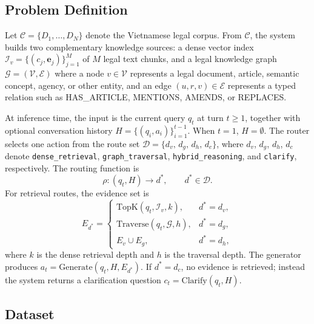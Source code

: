 ﻿\documentclass[11pt,twocolumn]{article}
\begin{document}
\subsection{Problem Definition}
\label{subsec:problem_definition}

Let $\mathcal{C}=\{D_1,\ldots,D_N\}$ denote the Vietnamese legal
corpus. From $\mathcal{C}$, the system builds two complementary
knowledge sources: a dense vector index
$\mathcal{I}_v=\{(c_j,\mathbf{e}_j)\}_{j=1}^{M}$ of $M$ legal text
chunks, and a legal knowledge graph
$\mathcal{G}=(\mathcal{V},\mathcal{E})$ where a node
$v\in\mathcal{V}$ represents a legal document, article, semantic concept,
agency, or other entity, and an edge $(u,r,v)\in\mathcal{E}$ represents a
typed relation such as \textsc{HAS\_ARTICLE}, \textsc{MENTIONS},
\textsc{AMENDS}, or \textsc{REPLACES}.

At inference time, the input is the current query $q_t$ at turn
$t\geq 1$, together with optional conversation history
$H=\{(q_i,a_i)\}_{i=1}^{t-1}$. When $t=1$, $H=\emptyset$. The
router selects one action from the route set
$\mathcal{D}=\{d_v,\,d_g,\,d_h,\,d_c\}$, where $d_v$, $d_g$,
$d_h$, $d_c$ denote \texttt{dense\_retrieval},
\texttt{graph\_traversal}, \texttt{hybrid\_reasoning}, and
\texttt{clarify}, respectively. The routing function is
\begin{equation}
\rho:(q_t,H)\rightarrow d^*,\qquad d^*\in\mathcal{D}.
\label{eq:routing_function}
\end{equation}
For retrieval routes, the evidence set is
\begin{equation}
E_{d^*}=\begin{cases}
\mathrm{TopK}(q_t,\mathcal{I}_v,k), & d^*=d_v,\\
\mathrm{Traverse}(q_t,\mathcal{G},h), & d^*=d_g,\\
E_v\cup E_g, & d^*=d_h,
\end{cases}
\label{eq:evidence_set}
\end{equation}
where $k$ is the dense retrieval depth and $h$ is the traversal
depth. The generator produces $a_t=\mathrm{Generate}(q_t,H,E_{d^*})$.
If $d^*=d_c$, no evidence is retrieved; instead the system returns
a clarification question $c_t=\mathrm{Clarify}(q_t,H)$.

\subsection{Dataset}
\label{subsec:dataset}
\end{document}
